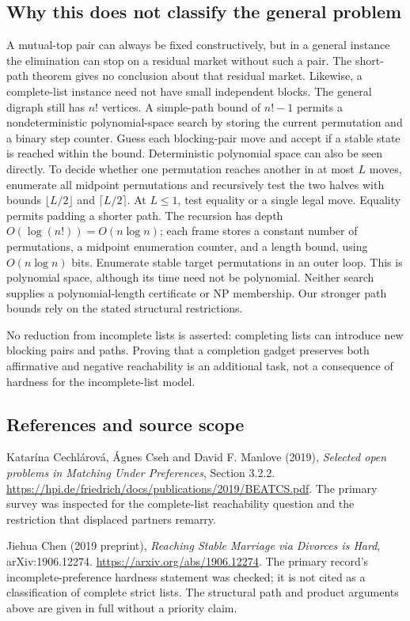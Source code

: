 \documentclass[11pt,a4paper]{article}
\begin{document}
\subsection*{Why this does not classify the general problem}
A mutual-top pair can always be fixed constructively, but in a general instance the elimination can stop on a residual market without such a pair. The short-path theorem gives no conclusion about that residual market. Likewise, a complete-list instance need not have small independent blocks. The general digraph still has $n!$ vertices. A simple-path bound of $n!-1$ permits a nondeterministic polynomial-space search by storing the current permutation and a binary step counter. Guess each blocking-pair move and accept if a stable state is reached within the bound. Deterministic polynomial space can also be seen directly. To decide whether one permutation reaches another in at most $L$ moves, enumerate all midpoint permutations and recursively test the two halves with bounds $\lfloor L/2\rfloor$ and $\lceil L/2\rceil$. At $L\le1$, test equality or a single legal move. Equality permits padding a shorter path. The recursion has depth $O(\log(n!))=O(n\log n)$; each frame stores a constant number of permutations, a midpoint enumeration counter, and a length bound, using $O(n\log n)$ bits. Enumerate stable target permutations in an outer loop. This is polynomial space, although its time need not be polynomial. Neither search supplies a polynomial-length certificate or NP membership. Our stronger path bounds rely on the stated structural restrictions.

No reduction from incomplete lists is asserted: completing lists can introduce new blocking pairs and paths. Proving that a completion gadget preserves both affirmative and negative reachability is an additional task, not a consequence of hardness for the incomplete-list model.

\subsection*{References and source scope}
Katar\'ina Cechl\'arov\'a, \'Agnes Cseh and David F. Manlove (2019), \emph{Selected open problems in Matching Under Preferences}, Section 3.2.2. \url{https://hpi.de/friedrich/docs/publications/2019/BEATCS.pdf}. The primary survey was inspected for the complete-list reachability question and the restriction that displaced partners remarry.

Jiehua Chen (2019 preprint), \emph{Reaching Stable Marriage via Divorces is Hard}, arXiv:1906.12274. \url{https://arxiv.org/abs/1906.12274}. The primary record's incomplete-preference hardness statement was checked; it is not cited as a classification of complete strict lists. The structural path and product arguments above are given in full without a priority claim.
\end{document}
